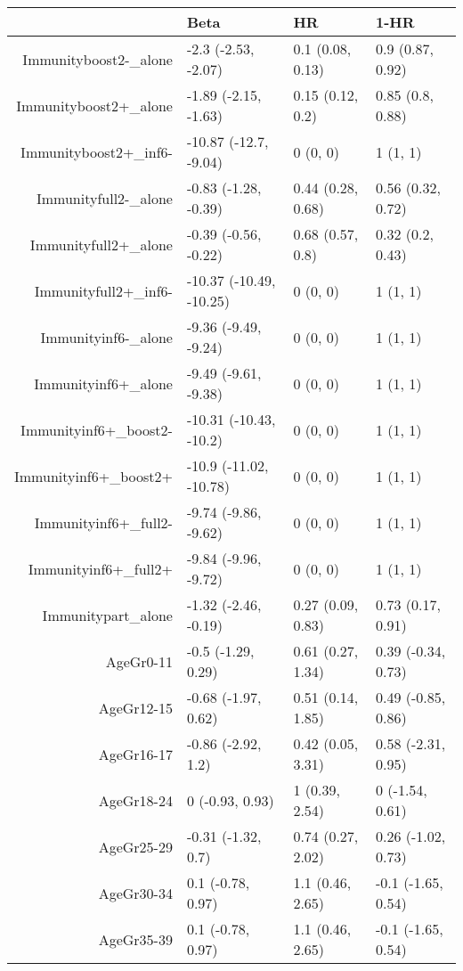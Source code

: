 \begin{table}[ht]
\centering
\begin{tabular}{rlll}
  \hline
 & Beta & HR & 1-HR \\ 
  \hline
Immunityboost2-\_alone & -2.3 (-2.53, -2.07) & 0.1 (0.08, 0.13) & 0.9 (0.87, 0.92) \\ 
  Immunityboost2+\_alone & -1.89 (-2.15, -1.63) & 0.15 (0.12, 0.2) & 0.85 (0.8, 0.88) \\ 
  Immunityboost2+\_inf6- & -10.87 (-12.7, -9.04) & 0 (0, 0) & 1 (1, 1) \\ 
  Immunityfull2-\_alone & -0.83 (-1.28, -0.39) & 0.44 (0.28, 0.68) & 0.56 (0.32, 0.72) \\ 
  Immunityfull2+\_alone & -0.39 (-0.56, -0.22) & 0.68 (0.57, 0.8) & 0.32 (0.2, 0.43) \\ 
  Immunityfull2+\_inf6- & -10.37 (-10.49, -10.25) & 0 (0, 0) & 1 (1, 1) \\ 
  Immunityinf6-\_alone & -9.36 (-9.49, -9.24) & 0 (0, 0) & 1 (1, 1) \\ 
  Immunityinf6+\_alone & -9.49 (-9.61, -9.38) & 0 (0, 0) & 1 (1, 1) \\ 
  Immunityinf6+\_boost2- & -10.31 (-10.43, -10.2) & 0 (0, 0) & 1 (1, 1) \\ 
  Immunityinf6+\_boost2+ & -10.9 (-11.02, -10.78) & 0 (0, 0) & 1 (1, 1) \\ 
  Immunityinf6+\_full2- & -9.74 (-9.86, -9.62) & 0 (0, 0) & 1 (1, 1) \\ 
  Immunityinf6+\_full2+ & -9.84 (-9.96, -9.72) & 0 (0, 0) & 1 (1, 1) \\ 
  Immunitypart\_alone & -1.32 (-2.46, -0.19) & 0.27 (0.09, 0.83) & 0.73 (0.17, 0.91) \\ 
  AgeGr0-11 & -0.5 (-1.29, 0.29) & 0.61 (0.27, 1.34) & 0.39 (-0.34, 0.73) \\ 
  AgeGr12-15 & -0.68 (-1.97, 0.62) & 0.51 (0.14, 1.85) & 0.49 (-0.85, 0.86) \\ 
  AgeGr16-17 & -0.86 (-2.92, 1.2) & 0.42 (0.05, 3.31) & 0.58 (-2.31, 0.95) \\ 
  AgeGr18-24 & 0 (-0.93, 0.93) & 1 (0.39, 2.54) & 0 (-1.54, 0.61) \\ 
  AgeGr25-29 & -0.31 (-1.32, 0.7) & 0.74 (0.27, 2.02) & 0.26 (-1.02, 0.73) \\ 
  AgeGr30-34 & 0.1 (-0.78, 0.97) & 1.1 (0.46, 2.65) & -0.1 (-1.65, 0.54) \\ 
  AgeGr35-39 & 0.1 (-0.78, 0.97) & 1.1 (0.46, 2.65) & -0.1 (-1.65, 0.54) \\ 

\end{tabular}
\end{table}

